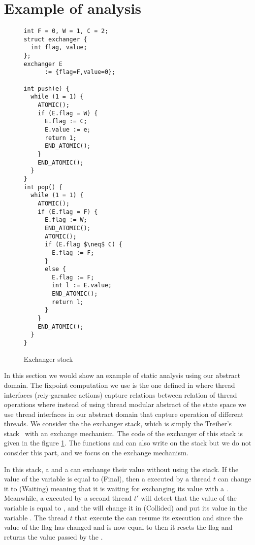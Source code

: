 \section{Example of analysis}
\label{sec:example}

\begin{figure}
\begin{multicols}{2}
\begin{lstlisting}
int F = 0, W = 1, C = 2;
struct exchanger {
  int flag, value;
};
exchanger E 
      := {flag=F,value=0};

int push(e) {
  while (1 = 1) {
    ATOMIC();
    if (E.flag = W) {
      E.flag := C;
      E.value := e;
      return 1;
      END_ATOMIC();
    }
    END_ATOMIC();
  }
}
int pop() {
  while (1 = 1) {
    ATOMIC();
    if (E.flag = F) {
      E.flag := W;
      END_ATOMIC();
      ATOMIC();
      if (E.flag $\neq$ C) {
        E.flag := F;
      }
      else {
        E.flag := F;
        int l := E.value;
        END_ATOMIC();
        return l;
      }
    }
    END_ATOMIC();
  }
}
\end{lstlisting}
\end{multicols}
\caption{Exchanger stack}
\label{fig:exchangerstack}
\end{figure}


In this section we would show an example of static analysis using our abstract domain. The fixpoint computation we use is the one defined in \cite{vv2} where thread interfaces (rely-garantee actions) capture relations between relation of thread operations where instead of using thread modular abstract of the state space we use thread interfaces in our abstract domain that capture operation of different threads. We consider the the exchanger stack, which is simply the Treiber's stack~\cite{DBLP:conf/spaa/HendlerSY04} with an exchange mechanism. The code of the exchanger of this stack is given in the figure \ref{fig:exchangerstack}. 
The functions  and  can also write on the stack but we do not consider this part, and we focus on the exchange mechanism.

In this stack, a  and a  can exchange their value without using the stack. If the value of the variable  is equal to  (Final), then a  executed by a thread $t$ can change it to  (Waiting) meaning that it is waiting for exchanging its value with a . 
Meanwhile, a  executed by a second thread $t'$ will detect that the value of the  variable is equal to , and the  will change it in  (Collided) and put its value  in the variable . 
The thread $t$ that execute the  can resume its execution and since the value of the flag has changed and is now equal to  then it resets the flag and returns the value passed by the . 

